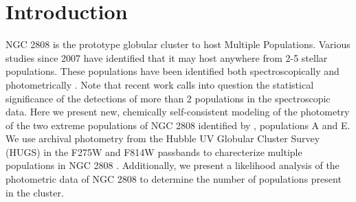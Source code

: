 \section{Introduction}\label{sec:NGC2808_intro}

NGC 2808 is the prototype globular cluster to host Multiple Populations.
Various studies since 2007 have identified that it may host anywhere from 2-5
stellar populations. These populations have been identified both
spectroscopically \citep[i.e.][]{} and photometrically \citep[i.e.][]{}. Note
that recent work \citep{Valle2022} calls into question the statistical
significance of the detections of more than 2 populations in the spectroscopic
data. Here we present new, chemically self-consistent modeling of the
photometry of the two extreme populations of NGC 2808 identified by
\citet{Milone2015}, populations A and E. We use archival photometry from the
Hubble UV Globular Cluster Survey (HUGS) \citep{Piotto2015, Milone2017} in the
F275W and F814W passbands to charecterize multiple populations in NGC 2808
\citep{Milone2015, Milone2015b}. Additionally, we present a likelihood analysis of the
photometric data of NGC 2808 to determine the number of populations present in
the cluster.


